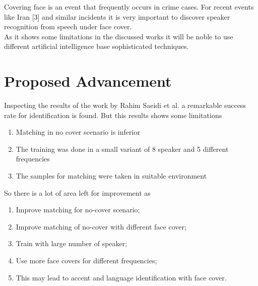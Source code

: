 \documentclass[12pt]{scrartcl}
\begin{document}
Covering face is an event that frequently occurs in crime cases. For recent events
like Iran [3] and similar incidents it is very important to discover speaker recognition
from speech under face cover.\\

As it shows some limitations in the discussed works it will be noble to use different
artificial intelligence base sophisticated techniques.

\section{Proposed Advancement}
Inspecting the results of the work by Rahim Saeidi et al. a remarkable success rate
for identification is found. But this results shows some limitations

\begin{enumerate}[label=(\roman*)]
	\item Matching in no cover scenario is inferior
	\item The training was done in a small variant of 8 speaker and 5 different frequencies
	\item The samples for matching were taken in suitable environment
\end{enumerate}

So there is a lot of area left for improvement as
\begin{enumerate}[label=(\roman*)]
	\item Improve matching for no-cover scenario;
	\item Improve matching of no-cover with different face cover;
	\item Train with large number of speaker;
	\item Use more face covers for different frequencies;
	\item This may lead to accent and language identification with face cover.
\end{enumerate}

\pagebreak



\end{document}
